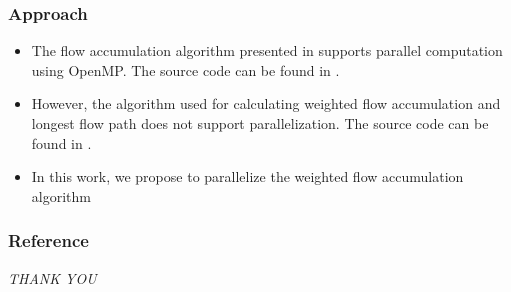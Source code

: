 \documentclass[]{beamer}
\begin{document}
	\begin{frame}
		\frametitle{Approach}
		
		\begin{itemize}
			\item The flow accumulation algorithm presented in \cite{CHO2023105771} supports parallel computation using OpenMP. The source code can be found in \cite{r.flowaccumulation}.
			
			\item However, the algorithm used for calculating weighted flow accumulation and longest flow path \cite{CHO2020104774} does not support parallelization. The source code can be found in \cite{r.accumulate}.
			
			\item In this work, we propose to parallelize the weighted flow accumulation algorithm 
		\end{itemize}
		
		
	\end{frame}

	
	
	
	\begin{frame}[allowframebreaks]
		\frametitle{Reference}
		
		
	\end{frame}
	
	\begin{frame}{}
		\centering \Large
		\emph{THANK YOU}
	\end{frame}
\end{document}
